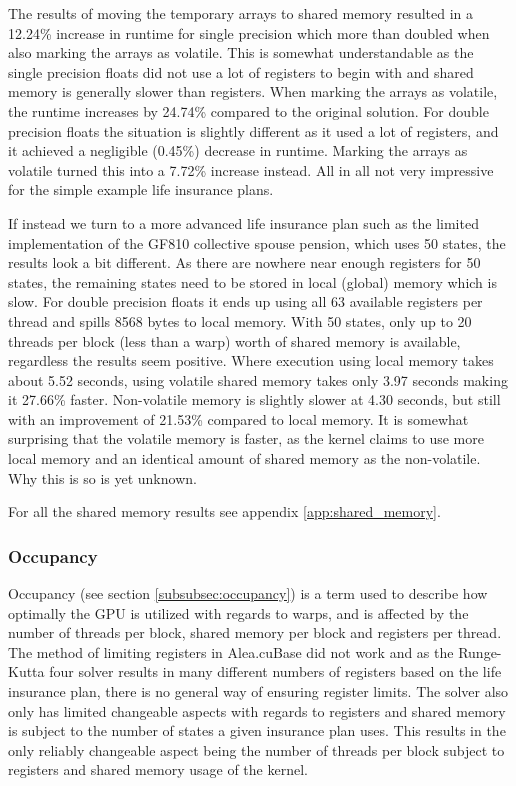 The results of moving the temporary arrays to shared memory resulted in a 12.24\% increase in runtime for single precision which more than doubled when also marking the arrays as volatile.
This is somewhat understandable as the single precision floats did not use a lot of registers to begin with and shared memory is generally slower than registers.
When marking the arrays as volatile, the runtime increases by 24.74\% compared to the original solution.
For double precision floats the situation is slightly different as it used a lot of registers, and it achieved a negligible (0.45\%) decrease in runtime.
Marking the arrays as volatile turned this into a 7.72\% increase instead.
All in all not very impressive for the simple example life insurance plans.

If instead we turn to a more advanced life insurance plan such as the limited implementation of the GF810 collective spouse pension, which uses 50 states, the results look a bit different.
As there are nowhere near enough registers for 50 states, the remaining states need to be stored in local (global) memory which is slow.
For double precision floats it ends up using all 63 available registers per thread and spills 8568 bytes to local memory.
With 50 states, only up to 20 threads per block (less than a warp) worth of shared memory is available, regardless the results seem positive.
Where execution using local memory takes about 5.52 seconds, using volatile shared memory takes only 3.97 seconds making it 27.66\% faster.
Non-volatile memory is slightly slower at 4.30 seconds, but still with an improvement of 21.53\% compared to local memory.
It is somewhat surprising that the volatile memory is faster, as the kernel claims to use more local memory and an identical amount of shared memory as the non-volatile.
Why this is so is yet unknown.

For all the shared memory results see appendix \ref{app:shared_memory}.

\subsubsection{Occupancy}\label{subsubsec:test:occupancy}
Occupancy (see section \ref{subsubsec:occupancy}) is a term used to describe how optimally the GPU is utilized with regards to warps, and is affected by the number of threads per block, shared memory per block and registers per thread.
The method of limiting registers in Alea.cuBase did not work and as the Runge-Kutta four solver results in many different numbers of registers based on the life insurance plan, there is no general way of ensuring register limits.
The solver also only has limited changeable aspects with regards to registers and shared memory is subject to the number of states a given insurance plan uses.
This results in the only reliably changeable aspect being the number of threads per block subject to registers and shared memory usage of the kernel.

